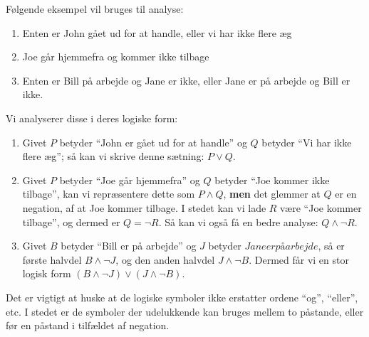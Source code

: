 \begin{example}
  Følgende eksempel vil bruges til analyse:
  \begin{enumerate}
    \item Enten er John gået ud for at handle, eller vi har ikke flere æg
    \item Joe går hjemmefra og kommer ikke tilbage
    \item Enten er Bill på arbejde og Jane er ikke, eller Jane er på arbejde og Bill er ikke.
  \end{enumerate}
Vi analyserer disse i deres logiske form:
  \begin{enumerate}
    \item Givet $P$ betyder ``John er gået ud for at handle'' og $Q$ betyder ``Vi har ikke flere æg''; så kan vi skrive denne sætning: $P \lor Q$.
    \item Givet $P$ betyder ``Joe går hjemmefra'' og $Q$ betyder ``Joe kommer ikke tilbage'', kan vi repræsentere dette som $P \land Q$, \textbf{men} det glemmer at $Q$ er en negation, af at Joe kommer tilbage. I stedet kan vi lade $R$ være ``Joe kommer tilbage'', og dermed er $Q = \neg R$. Så kan vi også få en bedre analyse: $Q \land \neg R$.
    \item Givet $B$ betyder ``Bill er på arbejde'' og $J$ betyder $Jane er på arbejde$, så er første halvdel $B \land \neg J$, og den anden halvdel $J \land \neg B$. Dermed får vi en stor logisk form $(B \land \neg J) \lor (J \land \neg B)$.
  \end{enumerate}
\end{example}

Det er vigtigt at huske at de logiske symboler ikke erstatter ordene ``og'', ``eller'', etc. I stedet er de symboler der udelukkende kan bruges mellem to påstande, eller før en påstand i tilfældet af negation.


